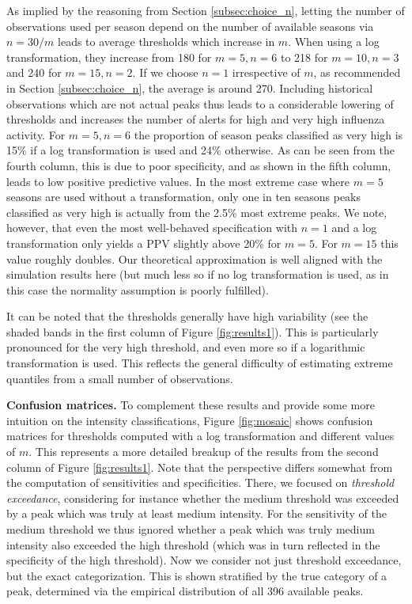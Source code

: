 \documentclass[12pt]{article}
\begin{document}
As implied by the reasoning from Section \ref{subsec:choice_n}, letting the number of observations used per season depend on the number of available seasons via $n = 30/m$ leads to average thresholds which increase in $m$. When using a log transformation, they increase from 180 for $m = 5, n = 6$ to 218 for $m = 10, n = 3$ and 240 for $m = 15, n = 2$. If we choose $n = 1$ irrespective of $m$, as recommended in Section \ref{subsec:choice_n}, the average is around 270. Including historical observations which are not actual peaks thus leads to a considerable lowering of thresholds and increases the number of alerts for high and very high influenza activity. For $m = 5, n = 6$ the proportion of season peaks classified as very high is 15\% if a log transformation is used and 24\% otherwise. As can be seen from the fourth column, this is due to poor specificity, and as shown in the fifth column, leads to low positive predictive values. In the most extreme case where $m = 5$ seasons are used without a transformation, only one in ten seasons peaks classified as very high is actually from the 2.5\% most extreme peaks. We note, however, that even the most well-behaved specification with $n = 1$ and a log transformation only yields a PPV slightly above 20\% for $m = 5$. For $m = 15$ this value roughly doubles. Our theoretical approximation is well aligned with the simulation results here (but much less so if no log transformation is used, as in this case the normality assumption is poorly fulfilled).


It can be noted that the thresholds generally have high variability (see the shaded bands in the first column of Figure \ref{fig:results1}). This is particularly pronounced for the very high threshold, and even more so if a logarithmic transformation is used. This reflects the general difficulty of estimating extreme quantiles from a small number of observations.

\textbf{Confusion matrices.} To complement these results and provide some more intuition on the intensity classifications, Figure \ref{fig:mosaic} shows confusion matrices for thresholds computed with a log transformation and different values of $m$. This represents a more detailed breakup of the results from the second column of Figure \ref{fig:results1}. Note that the perspective differs somewhat from the computation of sensitivities and specificities. There, we focused on \textit{threshold exceedance}, considering for instance whether the medium threshold was exceeded by a peak which was truly at least medium intensity. For the sensitivity of the medium threshold we thus ignored whether a peak which was truly medium intensity also exceeded the high threshold (which was in turn reflected in the specificity of the high threshold). Now we consider not just threshold exceedance, but the exact categorization. This is shown stratified by the true category of a peak, determined via the empirical distribution of all 396 available peaks. %
\end{document}
